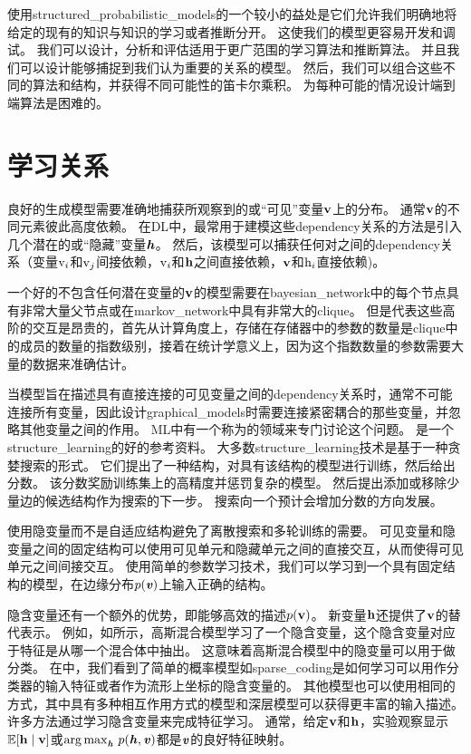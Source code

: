 使用\gls{structured_probabilistic_models}的一个较小的益处是它们允许我们明确地将给定的现有的知识与知识的学习或者推断分开。
这使我们的模型更容易开发和调试。 
我们可以设计，分析和评估适用于更广范围的学习算法和推断算法。
并且我们可以设计能够捕捉到我们认为重要的关系的模型。
然后，我们可以组合这些不同的算法和结构，并获得不同可能性的笛卡尔乘积。
为每种可能的情况设计端到端算法是困难的。



\section{学习关系}
\label{sec:learning_about_dependencies}

良好的生成模型需要准确地捕获所观察到的或``可见''变量$\mathbf{v}$上的分布。
通常$\mathbf{v}$的不同元素彼此高度依赖。
在\gls{DL}中，最常用于建模这些\gls{dependency}关系的方法是引入几个潜在的或``隐藏''变量$\boldsymbol{\mathit{h}}$。
然后，该模型可以捕获任何对之间的\gls{dependency}关系（变量$\mathrm{v}_i$和$\mathrm{v}_j$间接依赖，$\mathrm{v}_i$和$\mathbf{h}$之间直接依赖，$\mathbf{v}$和$\mathrm{h}_i$直接依赖)。

一个好的不包含任何潜在变量的$\mathbf{v}$的模型需要在\gls{bayesian_network}中的每个节点具有非常大量父节点或在\gls{markov_network}中具有非常大的\gls{clique}。
但是代表这些高阶的交互是昂贵的，首先从计算角度上，存储在存储器中的参数的数量是\gls{clique}中的成员的数量的指数级别，接着在统计学意义上，因为这个指数数量的参数需要大量的数据来准确估计。


当模型旨在描述具有直接连接的可见变量之间的\gls{dependency}关系时，通常不可能连接所有变量，因此设计\gls{graphical_models}时需要连接紧密耦合的那些变量，并忽略其他变量之间的作用。
\gls{ML}中有一个称为的领域来专门讨论这个问题。
\citet{koller-book2009}是一个\gls{structure_learning}的好的参考资料。
大多数\gls{structure_learning}技术是基于一种贪婪搜索的形式。
它们提出了一种结构，对具有该结构的模型进行训练，然后给出分数。 
该分数奖励训练集上的高精度并惩罚复杂的模型。
然后提出添加或移除少量边的候选结构作为搜索的下一步。
搜索向一个预计会增加分数的方向发展。 


使用隐变量而不是自适应结构避免了离散搜索和多轮训练的需要。 
可见变量和隐变量之间的固定结构可以使用可见单元和隐藏单元之间的直接交互，从而使得可见单元之间间接交互。
使用简单的参数学习技术，我们可以学习到一个具有固定结构的模型，在边缘分布$p(\boldsymbol{\mathit{v}})$上输入正确的结构。


隐含变量还有一个额外的优势，即能够高效的描述$p(\mathbf{v})$。
新变量$\mathbf{h}$还提供了$\mathbf{v}$的替代表示。
例如，如所示，高斯混合模型学习了一个隐含变量，这个隐含变量对应于特征是从哪一个混合体中抽出。
这意味着高斯混合模型中的隐变量可以用于做分类。
在中，我们看到了简单的概率模型如\gls{sparse_coding}是如何学习可以用作分类器的输入特征或者作为流形上坐标的隐含变量的。
其他模型也可以使用相同的方式，其中具有多种相互作用方式的模型和深层模型可以获得更丰富的输入描述。
许多方法通过学习隐含变量来完成特征学习。
通常，给定$\mathbf{v}$和$\mathbf{h}$，实验观察显示$\mathbb{E}[\mathbf{h}\mid\mathbf{v}]$或${\arg\max}_{\boldsymbol{\mathit{h}}}\ p(\boldsymbol{\mathit{h}},\boldsymbol{\mathit{v}})$都是$\boldsymbol{\mathit{v}}$的良好特征映射。

